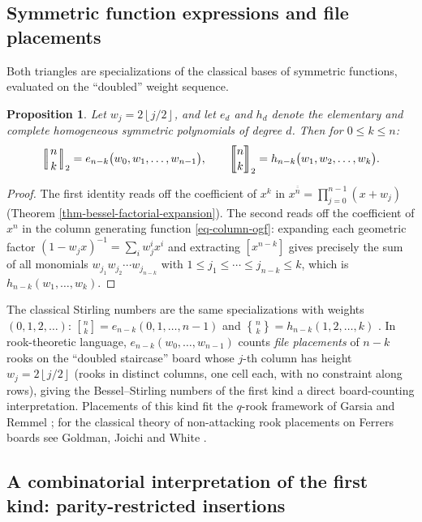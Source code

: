 \documentclass[a4paper]{amsart}
\numberwithin{equation}{section}
\newcommand{\Stirling}[0]{\genfrac\{\}{0pt}{}}
\newcommand{\Stirlingone}[0]{\genfrac[]{0pt}{}}
\newcommand{\mStirling}[0]{\genfrac{\llbracket}{\rrbracket}{0pt}{}}
\newcommand{\mStirlingone}[2]{\left[\mkern-3.8mu\middle|\genfrac{}{}{0pt}{}{#1}{#2}\middle|\mkern-3.8mu\right]}
\newcommand{\ooline}[1]{\overline{\overline{#1}}}
\newcommand{\floor}[1]{\left\lfloor #1 \right\rfloor}
\newtheorem{proposition}[theorem]{Proposition}
\begin{document}
\subsection{Symmetric function expressions and file placements}

Both triangles are specializations of the classical bases of symmetric functions, evaluated on the ``doubled'' weight sequence.

\begin{proposition}\label{prop-symmetric-functions}
Let $w_j = 2\floor{j/2}$, and let $e_d$ and $h_d$ denote the elementary and complete homogeneous symmetric polynomials of degree $d$. Then for $0 \le k \le n$:
\[
\mStirlingone{n}{k}_2 = e_{n-k}\big(w_0, w_1, \ldots, w_{n-1}\big), \qquad
\mStirling{n}{k}_2 = h_{n-k}\big(w_1, w_2, \ldots, w_{k}\big).
\]
\end{proposition}
\begin{proof}
The first identity reads off the coefficient of $x^k$ in $x^{\ooline{n}} = \prod_{j=0}^{n-1}(x + w_j)$ (Theorem \ref{thm-bessel-factorial-expansion}). The second reads off the coefficient of $x^{n}$ in the column generating function \eqref{eq-column-ogf}: expanding each geometric factor $\left(1-w_jx\right)^{-1} = \sum_i w_j^i x^i$ and extracting $[x^{n-k}]$ gives precisely the sum of all monomials $w_{j_1}w_{j_2}\cdots w_{j_{n-k}}$ with $1 \le j_1 \le \cdots \le j_{n-k} \le k$, which is $h_{n-k}(w_1, \ldots, w_k)$.
\end{proof}

The classical Stirling numbers are the same specializations with weights $(0, 1, 2, \ldots)$: $\Stirlingone{n}{k} = e_{n-k}(0,1,\ldots,n-1)$ and $\Stirling{n}{k} = h_{n-k}(1, 2, \ldots, k)$ \cite{comtet1974}. In rook-theoretic language, $e_{n-k}(w_0,\ldots,w_{n-1})$ counts \emph{file placements} of $n-k$ rooks on the ``doubled staircase'' board whose $j$-th column has height $w_j = 2\floor{j/2}$ (rooks in distinct columns, one cell each, with no constraint along rows), giving the Bessel--Stirling numbers of the first kind a direct board-counting interpretation. Placements of this kind fit the $q$-rook framework of Garsia and Remmel \cite{garsiaRemmel1986}; for the classical theory of non-attacking rook placements on Ferrers boards see Goldman, Joichi and White \cite{goldman_rook_1975}.

\subsection{A combinatorial interpretation of the first kind: parity-restricted insertions}
\end{document}
